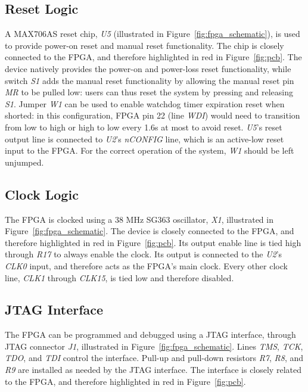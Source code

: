 \documentclass[titlepage]{scrartcl}
\begin{document}
	\clearpage

	

	\clearpage

	\subsection{Reset Logic}
	A MAX706AS reset chip, \textit{U5} (illustrated in Figure~\ref{fig:fpga_schematic}), is used to provide power-on reset and manual reset functionality. The chip is closely connected to the FPGA, and therefore highlighted in red in Figure~\ref{fig:pcb}. The device natively provides the power-on and power-loss reset functionality, while switch \textit{S1} adds the manual reset functionality by allowing the manual reset pin \textit{MR} to be pulled low: users can thus reset the system by pressing and releasing \textit{S1}. Jumper \textit{W1} can be used to enable watchdog timer expiration reset when shorted: in this configuration, FPGA pin 22 (line \textit{WDI}) would need to transition from low to high or high to low every 1.6s at most to avoid reset. \textit{U5}'s reset output line is connected to \textit{U2}'s \textit{nCONFIG} line, which is an active-low reset input to the FPGA. For the correct operation of the system, \textit{W1} should be left unjumped.\\

	\subsection{Clock Logic}
	The FPGA is clocked using a 38 MHz SG363 oscillator, \textit{X1}, illustrated in Figure~\ref{fig:fpga_schematic}. The device is closely connected to the FPGA, and therefore highlighted in red in Figure~\ref{fig:pcb}. Its output enable line is tied high through \textit{R17} to always enable the clock. Its output is connected to the \textit{U2}'s \textit{CLK0} input, and therefore acts as the FPGA's main clock. Every other clock line, \textit{CLK1} through \textit{CLK15}, is tied low and therefore disabled.\\

	\subsection{JTAG Interface}
	The FPGA can be programmed and debugged using a JTAG interface, through JTAG connector \textit{J1}, illustrated in Figure~\ref{fig:fpga_schematic}. Lines \textit{TMS}, \textit{TCK}, \textit{TDO}, and \textit{TDI} control the interface. Pull-up and pull-down resistors \textit{R7}, \textit{R8}, and \textit{R9} are installed as needed by the JTAG interface. The interface is closely related to the FPGA, and therefore highlighted in red in Figure~\ref{fig:pcb}.\\
\end{document}
